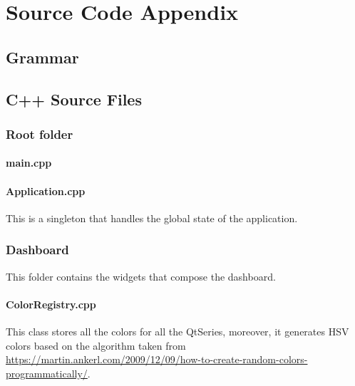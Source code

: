 
\part{Source Code Appendix}

\chapter{Grammar} \label{app:grammar}



\chapter{C++ Source Files}

\section{Root folder}

\subsection{main.cpp}


\subsection{Application.cpp}

This is a singleton that handles the global state of the application.



\section{Dashboard}
This folder contains the widgets that compose the dashboard.

\subsection{ColorRegistry.cpp} \label{code:coder}
\sloppy This class stores all the colors for all the QtSeries, moreover, it generates HSV colors based on the algorithm taken from \url{https://martin.ankerl.com/2009/12/09/how-to-create-random-colors-programmatically/}.


